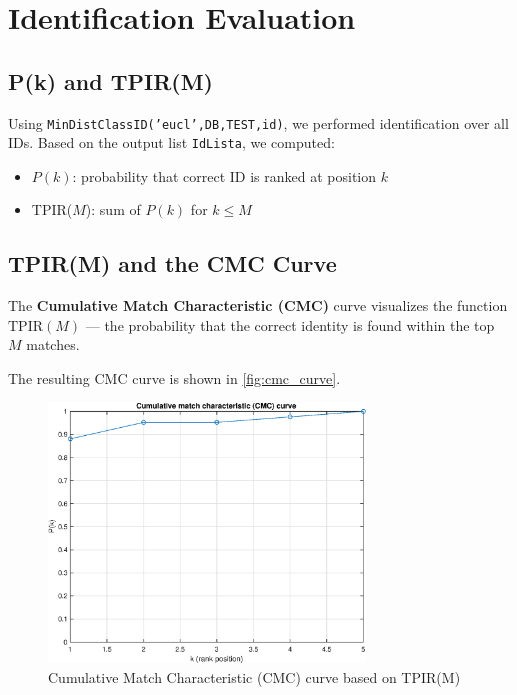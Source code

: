 \documentclass[a4paper,11pt]{article}
\begin{document}
\section{Identification Evaluation}

\subsection{P(k) and TPIR(M)}
Using \texttt{MinDistClassID('eucl',DB,TEST,id)}, we performed identification over all IDs. Based on the output list \texttt{IdLista}, we computed:
\begin{itemize}[noitemsep]
    \item $P(k)$: probability that correct ID is ranked at position $k$
    \item TPIR($M$): sum of $P(k)$ for $k \leq M$
\end{itemize}



\subsection{TPIR(M) and the CMC Curve}

The \textbf{Cumulative Match Characteristic (CMC)} curve visualizes the function $\mathrm{TPIR}(M)$ — the probability that the correct identity is found within the top $M$ matches.

The resulting CMC curve is shown in \autoref{fig:cmc_curve}.

\begin{figure}[H]
    \centering
    \includegraphics[width=0.75\textwidth]{figures/cmc_curve.eps}
    \caption{Cumulative Match Characteristic (CMC) curve based on TPIR(M)}
    \label{fig:cmc_curve}
\end{figure}
\end{document}
